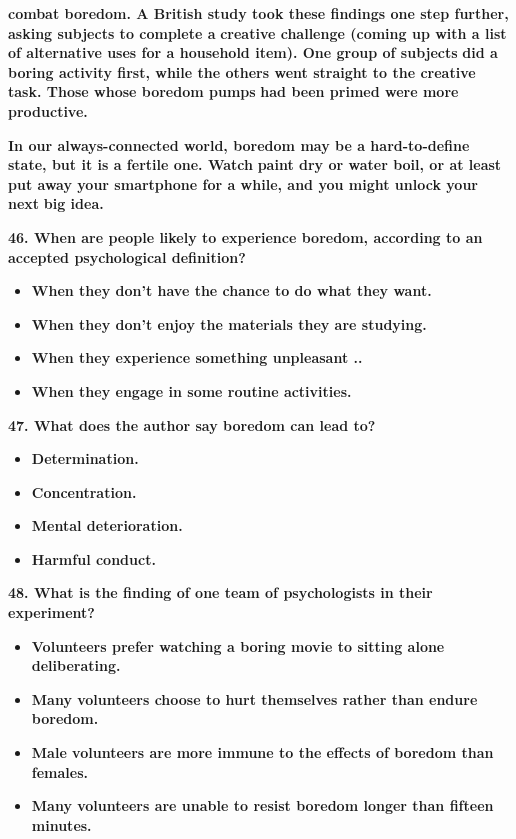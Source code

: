 \documentclass[UTF8,11pt]{ctexart}
\begin{document}
\textbf{combat boredom. A British study took these findings one step further, asking subjects to complete a} \textbf{creative challenge (coming up with a list of alternative uses for a household item). One group of subjects} \textbf{did a boring activity first, while the others went straight to the creative task. Those whose boredom pumps} \textbf{had been primed were more productive.}


\textbf{In our always-connected world, boredom may be a hard-to-define state, but it is a fertile one. Watch} \textbf{paint dry or water boil, or at least put away your smartphone for a while, and you might unlock your next} \textbf{big idea.}


\textbf{46. When are people likely to experience boredom, according to an accepted psychological definition?}


\begin{itemize}[leftmargin=2em,itemsep=.2em,topsep=.4em]\item[A.] \textbf{When they don't have the chance to do what they want.}
\item[B.] \textbf{When they don't enjoy the materials they are studying.}
\item[C.] \textbf{When they experience something unpleasant ..}
\item[D.] \textbf{When they engage in some routine activities.}
\end{itemize}

\textbf{47. What does the author say boredom can lead to?}


\begin{itemize}[leftmargin=2em,itemsep=.2em,topsep=.4em]\item[A.] \textbf{Determination.}
\item[B.] \textbf{Concentration.}
\item[C.] \textbf{Mental deterioration.}
\item[D.] \textbf{Harmful conduct.}
\end{itemize}

\textbf{48. What is the finding of one team of psychologists in their experiment?}


\begin{itemize}[leftmargin=2em,itemsep=.2em,topsep=.4em]\item[A.] \textbf{Volunteers prefer watching a boring movie to sitting alone deliberating.}
\item[B.] \textbf{Many volunteers choose to hurt themselves rather than endure boredom.}
\item[C.] \textbf{Male volunteers are more immune to the effects of boredom than females.}
\item[D.] \textbf{Many volunteers are unable to resist boredom longer than fifteen minutes.}
\end{itemize}
\end{document}
